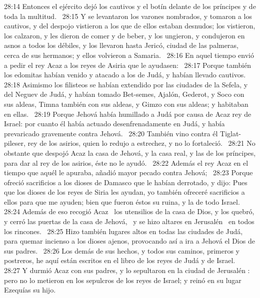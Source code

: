 																												28:14 Entonces el ejército dejó los cautivos y el botín delante de los príncipes y de toda la multitud.  
																												28:15 Y se levantaron los varones nombrados, y tomaron a los cautivos, y del despojo vistieron a los que de ellos estaban desnudos; los vistieron, los calzaron, y les dieron de comer y de beber, y los ungieron, y condujeron en asnos a todos los débiles, y los llevaron hasta Jericó, ciudad de las palmeras, cerca de sus hermanos; y ellos volvieron a Samaria.  
																												28:16 En aquel tiempo envió a pedir el rey Acaz a los reyes de Asiria que le ayudasen:  
																												28:17 Porque también los edomitas habían venido y atacado a los de Judá, y habían llevado cautivos.  
																												28:18 Asimismo los filisteos se habían extendido por las ciudades de la Sefela, y del Neguev de Judá, y habían tomado Bet-semes, Ajalón, Gederot, y Soco con sus aldeas, Timna también con sus aldeas, y Gimzo con sus aldeas; y habitaban en ellas.  
																												28:19 Porque Jehová había humillado a Judá por causa de Acaz rey de Israel: por cuanto él había actuado desenfrenadamente en Judá, y había prevaricado gravemente contra Jehová.  
																												28:20 También vino contra él Tiglat-pileser, rey de los asirios, quien lo redujo a estrechez, y no lo fortaleció.  
																												28:21 No obstante que despojó Acaz la casa de Jehová, y la casa real, y las de los príncipes, para dar al rey de los asirios, éste no le ayudó.  
																												28:22 Además el rey Acaz en el tiempo que aquél le apuraba, añadió mayor pecado contra Jehová;  
																												28:23 Porque ofreció sacrificios a los dioses de Damasco que le habían derrotado, y dijo: Pues que los dioses de los reyes de Siria les ayudan, yo también ofreceré sacrificios a ellos para que me ayuden; bien que fueron éstos su ruina, y la de todo Israel. 
																												28:24 Además de eso recogió Acaz  los utensilios de la casa de Dios, y los quebró, y cerró las puertas de la casa de Jehová,  y se hizo altares en Jerusalén  en todos los rincones.  
																												28:25 Hizo también lugares altos en todas las ciudades de Judá, para quemar incienso a los dioses ajenos, provocando así a ira a Jehová el Dios de sus padres.  
																												28:26 Los demás de sus hechos, y todos sus caminos, primeros y postreros, he aquí están escritos en el libro de los reyes de Judá y de Israel.  
																												28:27 Y durmió Acaz con sus padres, y lo sepultaron en la ciudad de Jerusalén : pero no lo metieron en los sepulcros de los reyes de Israel; y reinó en su lugar Ezequías su hijo.  
